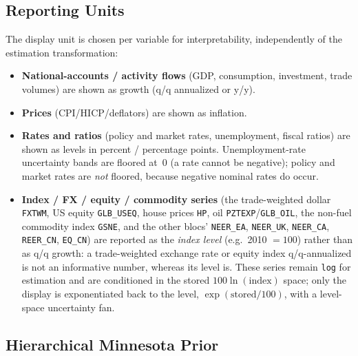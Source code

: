 \documentclass[11pt]{article}
\theoremstyle{definition}
\theoremstyle{remark}
\begin{document}
\subsection{Reporting Units}\label{sec:units}

The display unit is chosen per variable for interpretability, independently
of the estimation transformation:
\begin{itemize}
  \item \textbf{National-accounts / activity flows} (GDP, consumption,
    investment, trade volumes) are shown as growth (q/q annualized or y/y).
  \item \textbf{Prices} (CPI/HICP/deflators) are shown as inflation.
  \item \textbf{Rates and ratios} (policy and market rates, unemployment,
    fiscal ratios) are shown as levels in percent / percentage points.
    Unemployment-rate uncertainty bands are floored at~0 (a rate cannot be
    negative); policy and market rates are \emph{not} floored, because
    negative nominal rates do occur.
  \item \textbf{Index / FX / equity / commodity series} (the
    trade-weighted dollar \texttt{FXTWM}, US equity \texttt{GLB\_USEQ},
    house prices \texttt{HP}, oil \texttt{PZTEXP}/\texttt{GLB\_OIL}, the
    non-fuel commodity index
    \texttt{GSNE}, and the other blocs' \texttt{NEER\_EA},
    \texttt{NEER\_UK}, \texttt{NEER\_CA}, \texttt{REER\_CN},
    \texttt{EQ\_CN}) are reported as the \emph{index level}
    (e.g.\ 2010 $=100$) rather than as q/q growth: a trade-weighted
    exchange rate or equity index q/q-annualized is not an informative
    number, whereas its level is. These series remain \texttt{log} for
    estimation and are conditioned in the stored $100\ln(\text{index})$
    space; only the display is exponentiated back to the level,
    $\exp(\text{stored}/100)$, with a level-space uncertainty fan.
\end{itemize}

\subsection{Hierarchical Minnesota Prior}\label{sec:prior}
\end{document}

